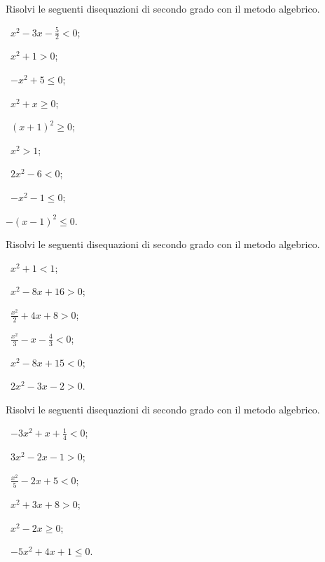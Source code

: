 \begin{esercizio}[\Ast]
\label{ese:4.3}
Risolvi le seguenti disequazioni di secondo grado con il metodo algebrico.
\begin{multicols}{3}
 \begin{enumeratea}
 \item~$x^2-3x-\frac 5 2<0$;
 \item~$x^2+1>0$;
 \item~$-x^2+5\le 0$;
 \item~$x^2+x\ge 0$;
 \item~$(x+1)^2\ge 0$;
 \item~$x^2>1$;
 \item~$2x^2-6<0$;
 \item~$-x^2-1\le 0$;
 \item $-(x-1)^{2}\le 0$.
 \end{enumeratea}
 \end{multicols}
\end{esercizio}

\begin{esercizio}[\Ast]
\label{ese:4.4}
Risolvi le seguenti disequazioni di secondo grado con il metodo algebrico.
\begin{multicols}{3}
 \begin{enumeratea}
 \item~$x^2+1<1$;
 \item~$x^2-8x+16>0$;
 \item~$\frac{x^{2}}{2}+4x+8>0$;
 \item~$\frac{x^{2}}{3}-x-\frac{4}{3}<0$;
 \item~$x^2-8x+15<0$;
 \item~$2x^2-3x-2>0$.
 \end{enumeratea}
 \end{multicols}
\end{esercizio}

\begin{esercizio}[\Ast]
\label{ese:4.5}
Risolvi le seguenti disequazioni di secondo grado con il metodo algebrico.
\begin{multicols}{3}
 \begin{enumeratea}
 \item~$-3x^2+x+\frac 1 4<0$;
 \item~$3x^2-2x-1>0$;
 \item~$\frac{x^{2}}{5}-2x+5<0$;
 \item~$x^2+3x+8>0$;
 \item~$x^2-2x\ge 0$;
 \item~$-5x^2+4x+1\le 0$.
 \end{enumeratea}
 \end{multicols}
\end{esercizio}

